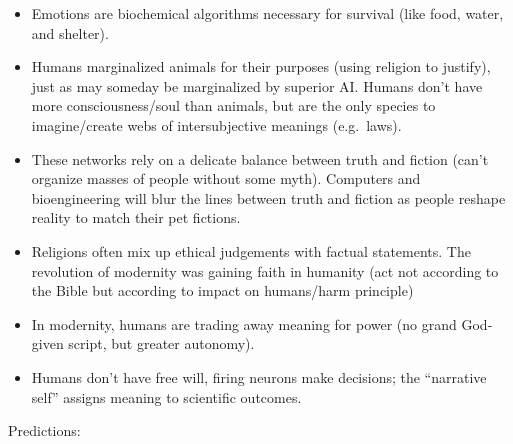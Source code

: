 \documentclass[
]{article}
\begin{document}
\begin{itemize}
\item
  Emotions are biochemical algorithms necessary for survival (like food,
  water, and shelter).
\item
  Humans marginalized animals for their purposes (using religion to
  justify), just as may someday be marginalized by superior AI. Humans
  don't have more consciousness/soul than animals, but are the only
  species to imagine/create webs of intersubjective meanings
  (e.g.~laws).
\item
  These networks rely on a delicate balance between truth and fiction
  (can't organize masses of people without some myth). Computers and
  bioengineering will blur the lines between truth and fiction as people
  reshape reality to match their pet fictions.
\item
  Religions often mix up ethical judgements with factual statements. The
  revolution of modernity was gaining faith in humanity (act not
  according to the Bible but according to impact on humans/harm
  principle)
\item
  In modernity, humans are trading away meaning for power (no grand
  God-given script, but greater autonomy).
\item
  Humans don't have free will, firing neurons make decisions; the
  ``narrative self'' assigns meaning to scientific outcomes.
\end{itemize}

Predictions:
\end{document}
